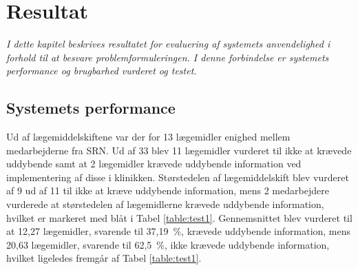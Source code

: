 \chapter{Resultat}
\textit{I dette kapitel beskrives resultatet for evaluering af systemets anvendelighed i forhold til at besvare problemformuleringen. I denne forbindelse er systemets performance og brugbarhed vurderet og testet.}


\section{Systemets performance}
Ud af lægemiddelskiftene var der for 13 lægemidler enighed mellem medarbejderne fra SRN. Ud af 33 blev 11 lægemidler vurderet til ikke at krævede uddybende samt at 2 lægemidler krævede uddybende information ved implementering af disse i klinikken. Størstedelen af lægemiddelskift blev vurderet af 9 ud af 11 til ikke at kræve uddybende information, mens 2 medarbejdere vurderede at størstedelen af lægemidlerne krævede uddybende information, hvilket er markeret med blåt i Tabel \ref{table:test1}. Gennemsnittet blev vurderet til at 12,27 lægemidler, svarende til 37,19~\%, krævede uddybende information, mens 20,63 lægemidler, svarende til 62,5~\%, ikke krævede uddybende information, hvilket ligeledes fremgår af Tabel \ref{table:test1}. 

